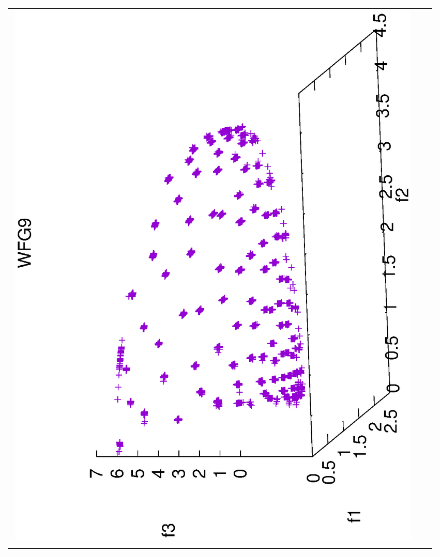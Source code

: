 \begin{figure}[H]
\begin{tabular}{cc}
  \includegraphics[scale=0.3, angle=-90,origin=c]{Figures_Chapter7/Results_Chapter4/Summary_Representative/VSD-MOEA-D/WFG9.eps} \\

\end{tabular}
\end{figure}
